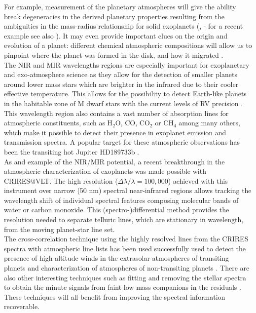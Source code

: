 \documentclass[pdftex,12pt,a4paper]{article}
\begin{document}
For example, measurement of the planetary atmospheres will give the ability break degeneracies in the derived planetary properties resulting from the ambiguities in the mass-radius relationship for solid exoplanets (\citealp[e.g.] []{Valencia2006, Fortney2007}, - for a recent example see also \citealp{Miller-Ricci2012}). It may even provide important clues on the origin and evolution of a planet: different chemical atmospheric compositions will allow us to pinpoint where the planet was formed in the disk, and how it migrated \citep{Figueira2009, Mordasini2012}.\\

The NIR and MIR wavelengths regions are especially important for exoplanetary and exo-atmosphere science as they allow for the detection of smaller planets around lower mass stars which are brighter in the infrared due to their cooler effective temperature. This allows for the possibility to detect Earth-like planets in the habitable zone of M dwarf stars with the current levels of RV precision \citep[e.g.][]{Reiners2010}. This wavelength region also contains a vast number of absorption lines for atmospheric constituents, such as H$_2$O, CO, CO$_2$ or CH$_4$ among many others, which make it possible to detect their presence in exoplanet emission and transmission spectra. A popular target for these atmospheric observations has been the transiting hot Jupiter HD189733b \citep[e.g.][]{Swain2008, Desert2009, Kok2013}. \\

As and example of the NIR/MIR potential, a recent breakthrough in the atmospheric characterization of exoplanets was made possible with CRIRES@VLT. The high resolution ($\Delta\lambda / \lambda = 100,000$) achieved with this instrument over narrow (50 nm) spectral near-infrared regions allows tracking the wavelength shift of individual spectral features composing molecular bands of water or carbon monoxide. This (spectro-)differential method provides the resolution needed to separate telluric lines, which are stationary in wavelength, from the moving planet-star line set.\\

The cross-correlation technique using the highly resolved lines from the CRIRES spectra with atmospheric line lists has been used successfully used to detect the presence of high altitude winds in the extrasolar atmospheres of transiting planets \citep[e.g.][]{Snellen2010} and characterization of atmospheres of non-transiting planets \citep[e.g.][]{Brogi2012}. There are also other interesting techniques such as fitting and removing the stellar spectra to obtain the minute signals from faint low mass companions in the residuals \citep{kolbl2015}. These techniques will all benefit from improving the spectral information recoverable.\\
\end{document}
